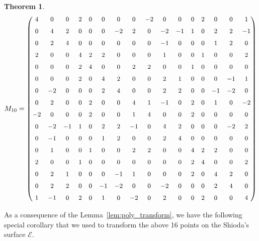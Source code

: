 \documentclass[11pt]{amsart}
\newcommand{\Ee}{{\mathcal E}}
\newtheorem{thm}{Theorem}[section]
\numberwithin{equation}{section}
\numberwithin{table}{section}
\newcommand\<{\langle}
\begin{document}
\begin{thm}
		\[
	\small %
	\setcounter{MaxMatrixCols}{20} %
	M_{10}=
	\begin{pmatrix}
	 	4 & 0 & 0 & 2 & 0 & 0 & 0 & 0 & -2 & 0 & 0 & 0 & 2 & 0 & 0 & 1 	\\ \noalign{\medskip}
	 	0 & 4 & 2 & 0 & 0 & 0 & -2 & 2 & 0 & -2 & -1 & 1 & 0 & 2 & 2 & -1 	\\ \noalign{\medskip}
	 	0 & 2 & 4 & 0 & 0 & 0 & 0 & 0 & 0 & -1 & 0 & 0 & 0 & 1 & 2 & 0 	\\ \noalign{\medskip}
	 	2 & 0 & 0 & 4 & 2 & 2 & 0 & 0 & 0 & 1 & 0 & 0 & 1 & 0 & 0 & 2 	\\ \noalign{\medskip}
	 	0 & 0 & 0 & 2 & 4 & 0 & 0 & 2 & 2 & 0 & 0 & 1 & 0 & 0 & 0 & 0 	\\ \noalign{\medskip}
	 	0 & 0 & 0 & 2 & 0 & 4 & 2 & 0 & 0 & 2 & 1 & 0 & 0 & 0 & -1 & 1 	\\ \noalign{\medskip}
	 	0 & -2 & 0 & 0 & 0 & 2 & 4 & 0 & 0 & 2 & 2 & 0 & 0 & -1 & -2 & 0 	\\ \noalign{\medskip}
	 	0 & 2 & 0 & 0 & 2 & 0 & 0 & 4 & 1 & -1 & 0 & 2 & 0 & 1 & 0 & -2 	\\ \noalign{\medskip}
	 	-2 & 0 & 0 & 0 & 2 & 0 & 0 & 1 & 4 & 0 & 0 & 2 & 0 & 0 & 0 & 0 	\\ \noalign{\medskip}
	 	0 & -2 & -1 & 1 & 0 & 2 & 2 & -1 & 0 & 4 & 2 & 0 & 0 & 0 & -2 & 2 	\\ \noalign{\medskip}
	 	0 & -1 & 0 & 0 & 0 & 1 & 2 & 0 & 0 & 2 & 4 & 0 & 0 & 0 & 0 & 0 	\\ \noalign{\medskip}
	 	0 & 1 & 0 & 0 & 1 & 0 & 0 & 2 & 2 & 0 & 0 & 4 & 2 & 2 & 0 & 0 	\\ \noalign{\medskip}
	 	2 & 0 & 0 & 1 & 0 & 0 & 0 & 0 & 0 & 0 & 0 & 2 & 4 & 0 & 0 & 2 	\\ \noalign{\medskip}
	 	0 & 2 & 1 & 0 & 0 & 0 & -1 & 1 & 0 & 0 & 0 & 2 & 0 & 4 & 2 & 0 	\\ \noalign{\medskip}
	 	0 & 2 & 2 & 0 & 0 & -1 & -2 & 0 & 0 & -2 & 0 & 0 & 0 & 2 & 4 & 0 	\\ \noalign{\medskip}
	 	1 & -1 & 0 & 2 & 0 & 1 & 0 & -2 & 0 & 2 & 0 & 0 & 2 & 0 & 0 & 4
	\end{pmatrix}
\]	

\end{thm}

 
 As a consequence of the Lemma~\ref{lem:poly_transform}, we have the following special corollary that we used to transform the above 16 points on the Shioda's surface $\Ee$.
 
\end{document}
